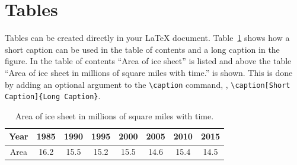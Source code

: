\clearpage

\section{Tables}\label{Sect:tabs}
Tables can be created directly in your \LaTeX{} document.  Table~\ref{tab:ice} shows how a short caption can be used in the table of contents and a long caption in the figure.  In the table of contents ``Area of ice sheet'' is listed and above the table ``Area of ice sheet in millions of square miles with time.'' is shown.  This is done by adding an optional argument to the \verb|\caption| command, \ie, \verb|\caption[Short Caption]{Long Caption}|.

\begin{table}[htbp]
  \centering
  \caption[Area of ice sheet]{Area of ice sheet in millions of square miles with time.}
  \label{tab:ice}
  \begin{tabular}{c | ccccccc}
    Year  & 1985 & 1990 & 1995 & 2000 & 2005 & 2010 & 2015\\\hline
    Area  & 16.2 & 15.5   & 15.2  & 15.5  & 14.6 & 15.4 & 14.5 
  \end{tabular}
\end{table}

